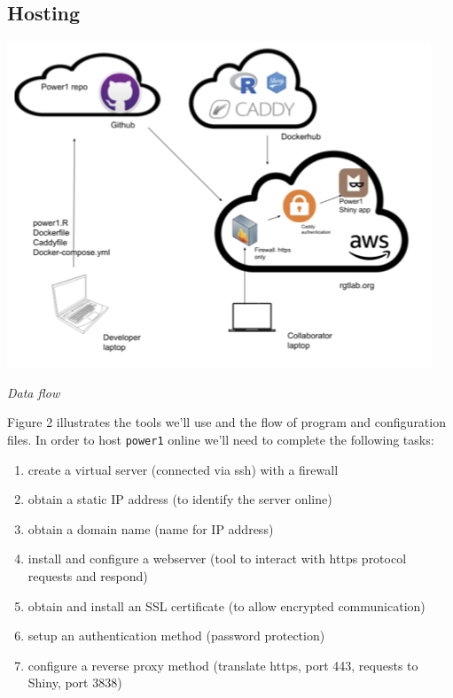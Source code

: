 \documentclass[
  letterpaper,
  DIV=11,
  numbers=noendperiod,
  oneside]{scrartcl}
\providecommand{\tightlist}{%
  \setlength{\itemsep}{0pt}\setlength{\parskip}{0pt}}\usepackage{longtable,booktabs,array}
\begin{document}
\hypertarget{hosting}{%
\subsection{Hosting}\label{hosting}}

\begin{marginfigure}

{\centering \includegraphics{img/blogdockerizeflow.png}

}

\caption{\emph{Data flow }}

\end{marginfigure}

Figure 2 illustrates the tools we'll use and the flow of program and
configuration files. In order to host \texttt{power1} online we'll need
to complete the following tasks:

\begin{enumerate}
\def\labelenumi{\arabic{enumi}.}
\tightlist
\item
  create a virtual server (connected via ssh) with a firewall
\item
  obtain a static IP address (to identify the server online)
\item
  obtain a domain name (name for IP address)
\item
  install and configure a webserver (tool to interact with https
  protocol requests and respond)
\item
  obtain and install an SSL certificate (to allow encrypted
  communication)
\item
  setup an authentication method (password protection)
\item
  configure a reverse proxy method (translate https, port 443, requests
  to Shiny, port 3838)
\end{enumerate}
\end{document}
